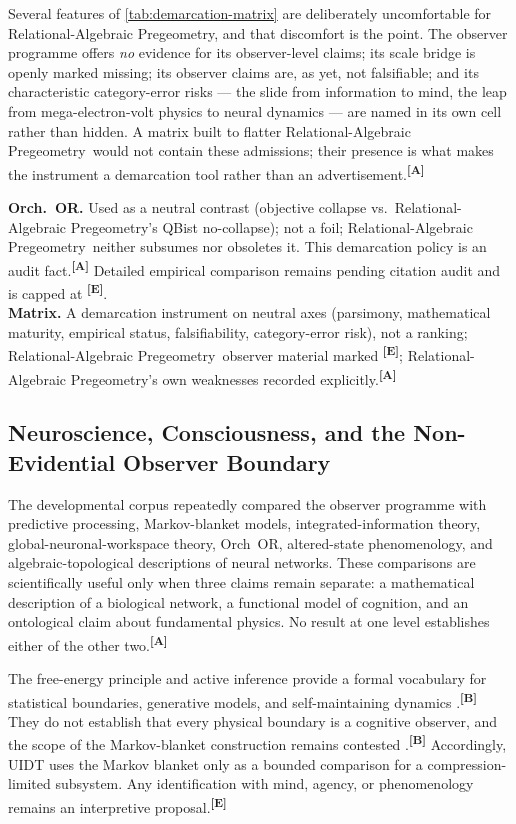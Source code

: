 \documentclass[12pt,a4paper,twoside]{article}
\theoremstyle{plain}
\theoremstyle{definition}
\theoremstyle{remark}
\newcommand{\ProjectShort}{Relational-Algebraic Pregeometry}
\newcommand{\RAP}{\ProjectShort}
\newcommand{\catmark}[1]{\textsuperscript{\textsf{\textbf{[#1]}}}}
\begin{document}
\noindent Several features of \cref{tab:demarcation-matrix} are deliberately
uncomfortable for \RAP, and that discomfort is the point. The observer
programme offers \emph{no} evidence for its observer-level claims; its
scale bridge is openly marked missing; its observer claims are, as yet, not
falsifiable; and its characteristic category-error risks --- the slide from
information to mind, the leap from mega-electron-volt physics to neural
dynamics --- are named in its own cell rather than hidden. A matrix built
to flatter \RAP\ would not contain these admissions; their presence is
what makes the instrument a demarcation tool rather than an
advertisement.\catmark{A}

\begin{evidencebox}{}
\textbf{Orch.\ OR.} Used as a neutral contrast (objective collapse vs.\
\RAP's QBist no-collapse); not a foil; \RAP\ neither subsumes nor
obsoletes it. This demarcation policy is an audit fact.\catmark{A}
Detailed empirical comparison remains pending citation audit and is capped at
\catmark{E}.\\[0.3em]
\textbf{Matrix.} A demarcation instrument on neutral axes (parsimony,
mathematical maturity, empirical status, falsifiability, category-error
risk), not a ranking; \RAP\ observer material marked \catmark{E}; \RAP's
own weaknesses recorded explicitly.\catmark{A}
\end{evidencebox}

\subsection{Neuroscience, Consciousness, and the Non-Evidential Observer Boundary}
\label{subsec:ctx-observer-boundary}

The developmental corpus repeatedly compared the observer programme with
predictive processing, Markov-blanket models, integrated-information theory,
global-neuronal-workspace theory, Orch~OR, altered-state phenomenology, and
algebraic-topological descriptions of neural networks. These comparisons are
scientifically useful only when three claims remain separate: a mathematical
description of a biological network, a functional model of cognition, and an
ontological claim about fundamental physics. No result at one level establishes
either of the other two.\catmark{A}

The free-energy principle and active inference provide a formal vocabulary for
statistical boundaries, generative models, and self-maintaining dynamics
\cite{friston2010,kirchhoff2018}.\catmark{B} They do not establish that every
physical boundary is a cognitive observer, and the scope of the Markov-blanket
construction remains contested \cite{raja2021}.\catmark{B} Accordingly, UIDT
uses the Markov blanket only as a bounded comparison for a compression-limited
subsystem. Any identification with mind, agency, or phenomenology remains an
interpretive proposal.\catmark{E}
\end{document}
